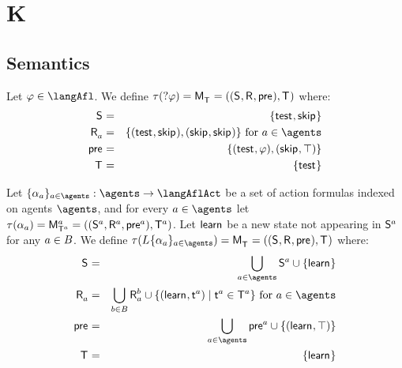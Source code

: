 \section{K}

\subsection{Semantics}

\begin{definition}[Test]\label{afl-k-test}
Let $\phi \in \langAfl$. 
We define $\tau(\test{\phi}) = \aPModel{\aStatesT} = \aPModelTuple{\aStatesT}$ where:
\begin{eqnarray*}
    \aStates &=& \{\aStateTest, \aStateSkip\}\\
    \aAccessibility{\agentA} &=& \{(\aStateTest, \aStateSkip), (\aStateSkip, \aStateSkip)\} \text{ for } \agentA \in \agents\\
    \aPrecondition &=& \{(\aStateTest, \phi), (\aStateSkip, \top)\}\\
    \aStatesT &=& \{\aStateTest\}
\end{eqnarray*}
\end{definition}

\begin{definition}[Learning]\label{afl-k-learning}
Let $\{\alpha_\agentA\}_{\agentA \in \agents} : \agents \to \langAflAct$ be a set of action formulas indexed on agents $\agents$, and for every $\agentA \in \agents$ let $\tau(\alpha_\agentA) = \aPModel[\agentA]{\aStatesT[\agentA]} = \aPModelTuple[\agentA]{\aStatesT[\agentA]}$.
Let $\aStateLearn$ be a new state not appearing in $\aStates[\agentA]$ for any $\agentA \in \agentsB$.
We define $\tau(\learns \{\alpha_\agentA\}_{\agentA \in \agents}) = \aPModel{\aStatesT} = \aPModelTuple{\aStatesT}$ where:
\begin{eqnarray*}
    \aStates &=& \bigcup_{\agentA \in \agents} \aStates[\agentA] \cup \{\aStateLearn\}\\
    \aAccessibility{\agentA} &=& \bigcup_{\agentB \in \agentsB} \aAccessibility[\agentB]{\agentA} \cup \{(\aStateLearn, \aStateT[\agentA]) \mid \aStateT[\agentA] \in \aStatesT[\agentA]\} \text{ for } \agentA \in \agents\\
    \aPrecondition &=& \bigcup_{\agentA \in \agents} \aPrecondition[\agentA] \cup \{(\aStateLearn, \top)\}\\
    \aStatesT &=& \{\aStateLearn\}
\end{eqnarray*}
\end{definition}

